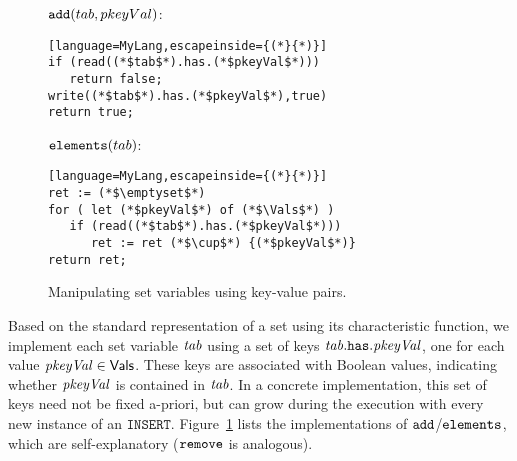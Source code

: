 \begin{figure}[t]
\centering
\small
\begin{minipage}[t]{4.2cm}
\begin{flushleft}
$\mathtt{add}(tab,pkeyVal)$:
\end{flushleft}
\vspace{-2mm}
\begin{lstlisting}[language=MyLang,escapeinside={(*}{*)}] 
if (read((*$tab$*).has.(*$pkeyVal$*))) 
   return false;
write((*$tab$*).has.(*$pkeyVal$*),true)
return true;
\end{lstlisting}
\end{minipage}
%
%
%
\begin{minipage}[t]{4cm}
\begin{flushleft}
$\mathtt{elements}(tab)$:
\end{flushleft}
\vspace{-2mm}
\begin{lstlisting}[language=MyLang,escapeinside={(*}{*)}]
ret := (*$\emptyset$*)
for ( let (*$pkeyVal$*) of (*$\Vals$*) )
   if (read((*$tab$*).has.(*$pkeyVal$*))) 
      ret := ret (*$\cup$*) {(*$pkeyVal$*)}
return ret;
\end{lstlisting}
\end{minipage}
\vspace{-4mm}
    \caption{Manipulating set variables using key-value pairs.}
    \label{fig:ir-key}
\vspace{-3mm}
\end{figure}

Based on the standard representation of a set using its characteristic function, we implement each set variable $\mathit{tab}$ using a set of keys $\mathit{tab}.\mathtt{has}.\mathit{pkeyVal}$, one for each value $\mathit{pkeyVal}\in\mathsf{Vals}$. These keys are associated with Boolean values, indicating whether $\mathit{pkeyVal}$ is contained in $\mathit{tab}$. In a concrete implementation, this set of keys need not be fixed a-priori, but can grow during the execution with every new instance of an $\mathtt{INSERT}$. Figure~\ref{fig:ir-key} lists the implementations of $\mathtt{add}$/$\mathtt{elements}$, which are self-explanatory ($\mathtt{remove}$ is analogous).

